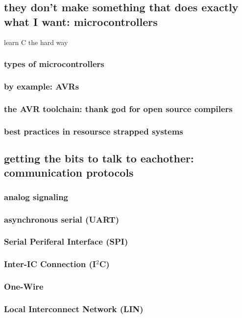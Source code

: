\documentclass[]{journal}
\begin{document}
	\subsection{they don't make something that does exactly what I want: microcontrollers}
		learn C the hard way
		\subsubsection{types of microcontrollers}
		\subsubsection{by example: AVRs}
		\subsubsection{the AVR toolchain: thank god for open source compilers}
		\subsubsection{best practices in resoursce strapped systems}
	\subsection{getting the bits to talk to eachother: communication protocols}
		\subsubsection{analog signaling}
		\subsubsection{asynchronous serial (UART)}
		\subsubsection{Serial Periferal Interface (SPI)}
		\subsubsection{Inter-IC Connection (I$^2$C)}
		\subsubsection{One-Wire}
		\subsubsection{Local Interconnect Network (LIN)}
\end{document}
